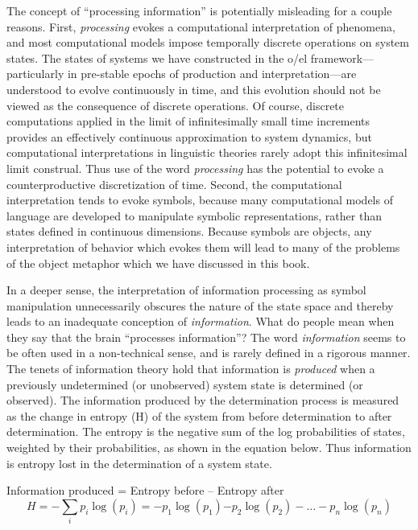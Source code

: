 The concept of “processing information” is potentially misleading for a couple reasons. First, \textit{processing} evokes a computational interpretation of phenomena, and most computational models impose temporally discrete operations on system states. The states of systems we have constructed in the o/el framework—particularly in pre-stable epochs of production and interpretation—are understood to evolve continuously in time, and this evolution should not be viewed as the consequence of discrete operations. Of course, discrete computations applied in the limit of infinitesimally small time increments provides an effectively continuous approximation to system dynamics, but computational interpretations in linguistic theories rarely adopt this infinitesimal limit construal. Thus use of the word \textit{processing} has the potential to evoke a counterproductive discretization of time. Second, the computational interpretation tends to evoke symbols, because many computational models of language are developed to manipulate symbolic representations, rather than states defined in continuous dimensions. Because symbols are objects, any interpretation of behavior which evokes them will lead to many of the problems of the object metaphor which we have discussed in this book. 

In a deeper sense, the interpretation of information processing as symbol manipulation unnecessarily obscures the nature of the state space and thereby leads to an inadequate conception of \textit{information}. What do people mean when they say that the brain “processes information”? The word \textit{information} seems to be often used in a non-technical sense, and is rarely defined in a rigorous manner. The tenets of information theory \citep{Shannon1948} hold that information is \textit{produced} when a previously undetermined (or unobserved) system state is determined (or observed). The information produced by the determination process is measured as the change in entropy (H) of the system from before determination to after determination. The entropy is the negative sum of the log probabilities of states, weighted by their probabilities, as shown in the equation below. Thus information is entropy lost in the determination of a system state.

\ea
  Information produced = Entropy before – Entropy after
$$
H=-\sum _{i}{{p}_{i}\log \left({p}_{i}\right)={-p}_{1}\log \left({p}_{1}\right){-p}_{2}\log \left({p}_{2}\right)-{\dots}-{p}_{n}\log \text{⁡}\left({p}_{n}\right)}
$$
\z

